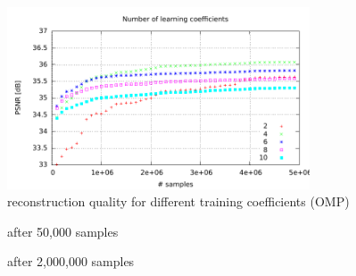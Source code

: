 \begin{figure}[h]
\centering
\includegraphics[width = 0.8\textwidth]{../tests/results/old/coeffsConverg.pdf}
\caption{reconstruction quality for different training coefficients (OMP)}
\label{fig:coeffsOMP}
\end{figure}



\begin{figure}[H]
\centering
{}
\hspace{15mm}
\caption{after 50,000 samples}
\label{fig:coeffsOMP50}
\end{figure}
\begin{figure}[H]
\centering
{}
\hspace{15mm}
\caption{after 2,000,000 samples}
\label{fig:coeffsOMP2000}
\end{figure}



